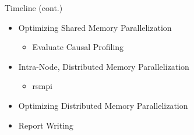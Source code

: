 \begin{frame}[t]{Timeline (cont.)}
\begin{itemize}
\item Optimizing Shared Memory Parallelization
  \begin{itemize}
    \item Evaluate Causal Profiling
  \end{itemize}
\pause
\item Intra-Node, Distributed Memory Parallelization
\begin{itemize}
\item rsmpi
\end{itemize}
\pause
\item Optimizing Distributed Memory Parallelization
\pause
\item Report Writing
\end{itemize}
\end{frame}
